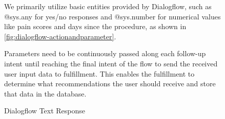 \documentclass[12pt,oneside,openright,a4paper]{cpe-english-project}
\begin{document}
\begin{figure}[H]
\begin{justify}
                \qquad We primarily utilize basic entities provided by Dialogflow, such as @sys.any for yes/no responses and @sys.number for numerical values like pain scores and days since the procedure, as shown in \ref{fig:dialogflow-actionandparameter}. \par
              \makeatother
              \qquad Parameters need to be continuously passed along each follow-up intent until reaching the final intent of the flow to send the received user input data to fulfillment. This enables the fulfillment to determine what recommendations the user should receive and store that data in the database.\par
            \end{justify}     
          \end{figure}
          \begin{figure}[H]
            \centering
            \caption{Dialogflow Text Response}\label{fig:dialogflow-textresponse}       
          \end{figure}
\end{document}
